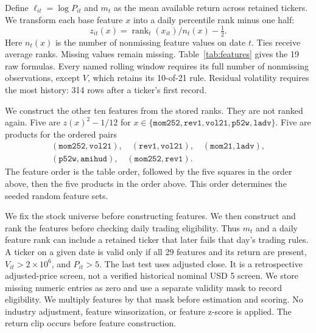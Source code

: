 \documentclass[10pt,letterpaper]{article}
\begin{document}
Define $\ell_{it}=\log P_{it}$ and $m_t$ as the mean available return across retained tickers. We transform each base feature $x$ into a daily percentile rank minus one half:
\[
 z_{it}(x)=\operatorname{rank}_{t}(x_{it})/n_t(x)-\tfrac12 .
\]
Here $n_t(x)$ is the number of nonmissing feature values on date $t$. Ties receive average ranks. Missing values remain missing. Table~\ref{tab:features} gives the 19 raw formulas. Every named rolling window requires its full number of nonmissing observations, except $V$, which retains its 10-of-21 rule. Residual volatility requires the most history: 314 rows after a ticker's first record.



We construct the other ten features from the stored ranks. They are not ranked again. Five are $z(x)^2-1/12$ for $x\in\{\texttt{mom252},\texttt{rev1},\texttt{vol21},\texttt{p52w},\texttt{ladv}\}$. Five are products for the ordered pairs
\[
\begin{gathered}
 (\texttt{mom252},\texttt{vol21}),\quad(\texttt{rev1},\texttt{vol21}),\quad
 (\texttt{mom21},\texttt{ladv}),\\
 (\texttt{p52w},\texttt{amihud}),\quad(\texttt{mom252},\texttt{rev1}).
\end{gathered}
\]
The feature order is the table order, followed by the five squares in the order above, then the five products in the order above. This order determines the seeded random feature sets.

We fix the stock universe before constructing features. We then construct and rank the features before checking daily trading eligibility. Thus $m_t$ and a daily feature rank can include a retained ticker that later fails that day's trading rules. A ticker on a given date is valid only if all 29 features and its return are present, $V_{it}>2\times10^6$, and $P_{it}>5$. The last test uses adjusted close. It is a retrospective adjusted-price screen, not a verified historical nominal USD 5 screen. We store missing numeric entries as zero and use a separate validity mask to record eligibility. We multiply features by that mask before estimation and scoring. No industry adjustment, feature winsorization, or feature z-score is applied. The return clip occurs before feature construction.
\end{document}

